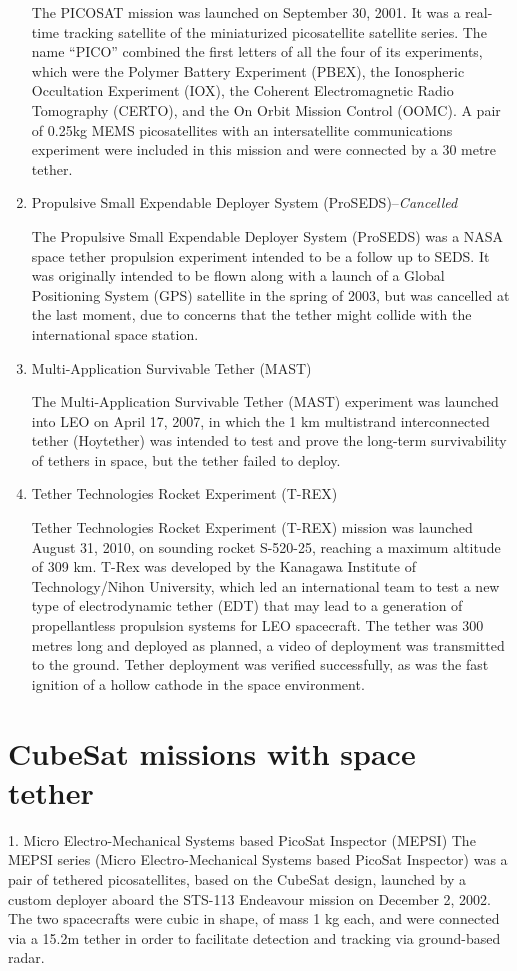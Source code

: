 \begin{enumerate}
The PICOSAT mission was launched on September 30, 2001. It was a real-time tracking satellite of the miniaturized picosatellite satellite series. The name “PICO” combined the first letters of all the four of its experiments, which were the Polymer Battery Experiment (PBEX), the Ionospheric Occultation Experiment (IOX), the Coherent Electromagnetic Radio Tomography (CERTO), and the On Orbit Mission Control (OOMC). A pair of 0.25kg MEMS picosatellites with an intersatellite communications experiment were included in this mission and were connected by a 30 metre tether.
\item{Propulsive Small Expendable Deployer System (ProSEDS)--\em{Cancelled}}
	
The Propulsive Small Expendable Deployer System (ProSEDS) was a NASA space tether propulsion experiment intended to be a follow up to SEDS. It was originally intended to be flown along with a launch of a Global Positioning System (GPS) satellite in the spring of 2003, but was cancelled at the last moment, due to concerns that the tether might collide with the international space station.

\item{Multi-Application Survivable Tether (MAST)}

The Multi-Application Survivable Tether (MAST) experiment was launched into LEO on April 17, 2007, in which the 1 km multistrand interconnected tether (Hoytether) was intended to test and prove the long-term survivability of tethers in space, but the tether failed to deploy. 
\item{Tether Technologies Rocket Experiment (T-REX)}

Tether Technologies Rocket Experiment (T-REX) mission was launched August 31, 2010, on sounding rocket S-520-25, reaching a maximum altitude of 309 km. T-Rex was developed by the Kanagawa Institute of Technology/Nihon University, which led an international team to test a new type of electrodynamic tether (EDT) that may lead to a generation of propellantless propulsion systems for LEO spacecraft. The tether was 300 metres long and deployed as planned, a video of deployment was transmitted to the ground. Tether deployment was verified successfully, as was the fast ignition of a hollow cathode in the space environment.
\end{enumerate} 

\section{CubeSat missions with space tether}
1.	Micro Electro-Mechanical Systems based PicoSat Inspector (MEPSI)
The MEPSI series (Micro Electro-Mechanical Systems based PicoSat Inspector) was a pair of tethered picosatellites, based on the CubeSat design, launched by a custom deployer aboard the STS-113 Endeavour mission on December 2, 2002. The two spacecrafts were cubic in shape, of mass 1 kg each, and were connected via a 15.2m tether in order to facilitate detection and tracking via ground-based radar.


